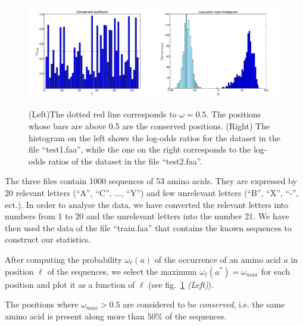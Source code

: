 \documentclass[paper=a4, fontsize=10pt]{article} %
\numberwithin{equation}{section} %
\numberwithin{figure}{section} %
\numberwithin{table}{section} %
\begin{document}
\begin{figure}[b]
\centering
\includegraphics[width=0.49\textwidth]{1.pdf}
\includegraphics[width=0.49\textwidth]{4.png}
\caption{\label{fig:1}(Left)The dotted red line corresponds to $\omega=0.5$. The positions whose bars are above 0.5 are the conserved positions. (Right) The histogram on the left shows the log-odds ratios for the dataset in the file ``test1.faa'', while the one on the right corresponds to the log-odds ratios of the dataset in the file ``test2.faa''.}
\end{figure}

The three files contain 1000 sequences of 53 amino acids. They are expressed by 20 relevant letters (``A'', ``C'', ..., ``Y'') and few unrelevant letters (``B'', ``X'', ``-'', ect.). In order to analyse the data, we have converted the relevant letters into numbers from 1 to 20 and the unrelevant letters into the number 21. We have then used the data of the file ``train.faa'' that contains the known sequences to construct our statistics.

After computing the probability $\omega_{\ell}(a)$ of the occurrence of an amino acid $a$ in position $\ell$ of the sequences, we select the maximum $\omega_{\ell}(a^*)=\omega_{max}$ for each position and plot it as a function of $\ell$ (see fig.~\ref{fig:1} \emph{(Left)}).

The positions where $\omega_{max}>0.5$ are considered to be \emph{conserved}, i.e. the same amino acid is present along more than $50\%$ of the sequences.
\end{document}
